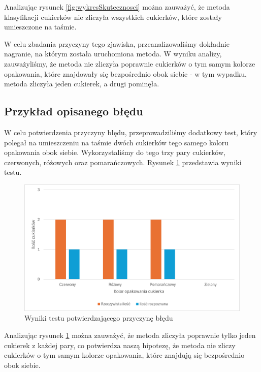 \documentclass{article}
\begin{document}
Analizując rysunek \ref{fig:wykresSkutecznosci} można zauważyć, że metoda klasyfikacji cukierków nie zliczyła wszystkich cukierków, które zostały umieszczone na taśmie.

W celu zbadania przyczyny tego zjawiska, przeanalizowaliśmy dokładnie nagranie, na którym została uruchomiona metoda. W wyniku analizy, zauważyliśmy, że metoda nie zliczyła poprawnie cukierków o tym samym kolorze opakowania, które znajdowały się bezpośrednio obok siebie - w tym wypadku, metoda zliczyła jeden cukierek, a drugi pominęła.

\subsection{Przykład opisanego błędu}
\label{Przykład opisanego błędu}
W celu potwierdzenia przyczyny błędu, przeprowadziliśmy dodatkowy test, który polegał na umieszczeniu na taśmie dwóch cukierków tego samego koloru opakowania obok siebie. Wykorzystaliśmy do tego trzy pary cukierków, czerwonych, różowych oraz pomarańczowych. Rysunek \ref{fig:wykresBledu} przedstawia wyniki testu.

\begin{figure}[H]
    \centering
    \label{fig:wykresBledu}
    \includegraphics{wykresBledu}
    \caption{Wyniki testu potwierdzającego przyczynę błędu}
\end{figure}

Analizując rysunek \ref{fig:wykresBledu} można zauważyć, że metoda zliczyła poprawnie tylko jeden cukierek z każdej pary, co potwierdza naszą hipotezę, że metoda nie zliczy cukierków o tym samym kolorze opakowania, które znajdują się bezpośrednio obok siebie.
\end{document}
